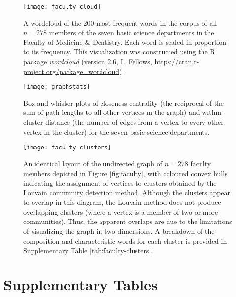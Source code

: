 \documentclass[12pt]{article}
\begin{document}
\begin{figure}[htbp]
\centering
\texttt{[image: faculty-cloud]}
\caption{
A wordcloud of the 200 most frequent words in the corpus of all $n=278$ members of the seven basic science departments in the Faculty of Medicine \& Dentistry.
Each word is scaled in proportion to its frequency.
This visualization was constructed using the R package \textit{wordcloud} (version 2.6, I.~Fellows, \protect\url{https://cran.r-project.org/package=wordcloud}).
}
\label{fig:faculty-wordcloud}
\end{figure}


\begin{figure}[htbp]
\centering
\texttt{[image: graphstats]}
\caption{
Box-and-whisker plots of closeness centrality (the reciprocal of the sum of path lengths to all other vertices in the graph) and within-cluster distance (the number of edges from a vertex to every other vertex in the cluster) for the seven basic science departments.
}
\label{fig:graphstats}
\end{figure}


\begin{figure}[htbp]
\centering
\texttt{[image: faculty-clusters]}
\caption{
An identical layout of the undirected graph of $n=278$ faculty members depicted in Figure \ref{fig:faculty}, with coloured convex hulls indicating the assignment of vertices to clusters obtained by the Louvain community detection method.
Although the clusters appear to overlap in this diagram, the Louvain method does not produce overlapping clusters (where a vertex is a member of two or more communities).
Thus, the apparent overlaps are due to the limitations of visualizing the graph in two dimensions.
A breakdown of the composition and characteristic words for each cluster is provided in Supplementary Table \ref{tab:faculty-clusters}.
}
\label{fig:faculty-clusters}
\end{figure}


\clearpage 
\section * {Supplementary Tables}

\renewcommand{\thetable}{S\arabic{table}}
\setcounter{table}{0}


\end{document}
